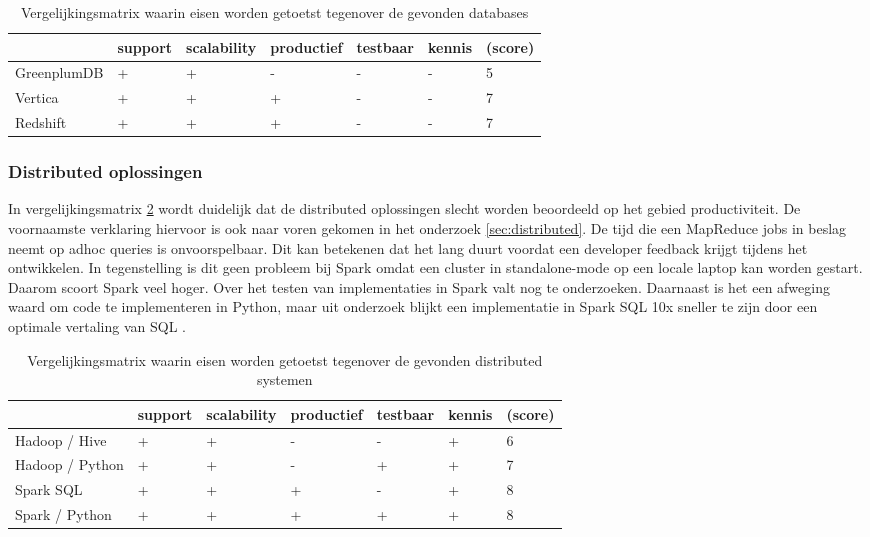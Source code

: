 \begin{table}[bh]
\caption{Vergelijkingsmatrix waarin eisen worden getoetst tegenover de gevonden databases}
\label{tab:matrix_databases}
\begin{tabular}{|p{3cm}|l|l|l|l|l|l|}
\hline
           & support & scalability               & productief & testbaar & kennis &     (score)  \\ \hline
GreenplumDB & +       & +                         & -          & -        & -      & 5     \\ \hline
Vertica     & +       & +                         & +          & -        & -      & 7     \\ \hline
Redshift    & +       & +                         & +          & -        & -      & 7     \\ \hline
\end{tabular}
\end{table}

\subsubsection{\textbf{Distributed oplossingen}}

In vergelijkingsmatrix \ref{tab:matrix_distributed} wordt duidelijk dat de distributed oplossingen slecht worden beoordeeld op het gebied productiviteit. De voornaamste verklaring hiervoor is ook naar voren gekomen in het onderzoek \ref{sec:distributed}. De tijd die een MapReduce jobs in beslag neemt op adhoc queries is onvoorspelbaar. Dit kan betekenen dat het lang duurt voordat een developer feedback krijgt tijdens het ontwikkelen. In tegenstelling is dit geen probleem bij Spark omdat een cluster in standalone-mode op een locale laptop kan worden gestart. Daarom scoort Spark veel hoger. Over het testen van implementaties in Spark valt nog te onderzoeken. Daarnaast is het een afweging waard om code te implementeren in Python, maar uit onderzoek blijkt een implementatie in Spark SQL 10x sneller te zijn door een optimale vertaling van SQL \parencite{armbrust2015spark}.

\begin{table}[bh]
\caption{Vergelijkingsmatrix waarin eisen worden getoetst tegenover de gevonden distributed systemen}
\label{tab:matrix_distributed}
\begin{tabular}{|p{3cm}|l|l|l|l|l|l|}
\hline
                & support & scalability               & productief & testbaar & kennis &     (score)  \\ \hline
Hadoop / Hive   & +       & +                         & -          & -        & +      & 6     \\ \hline
Hadoop / Python & +       & +                         & -          & +        & +      & 7     \\ \hline
Spark SQL       & +       & +                         & +          & -        & +      & 8     \\ \hline
Spark / Python  & +       & +                        & +          & +        & +      & 8     \\ \hline
\end{tabular}
\end{table}

